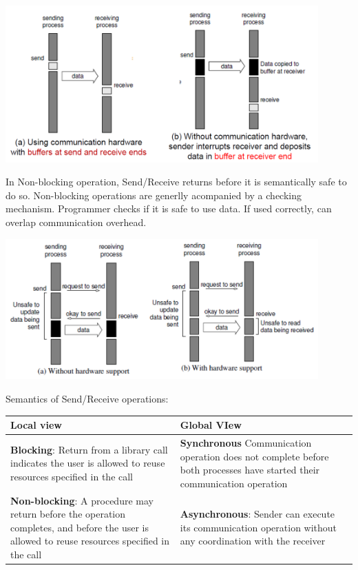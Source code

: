 \documentclass{article}
\begin{document}
\includegraphics[width=0.9\textwidth]{l8_buffered_blocking.png}

In Non-blocking operation, Send/Receive returns before it is semantically safe to do so.
Non-blocking operations are generlly acompanied by a checking mechanism.
Programmer checks if it is safe to use data.
If used correctly, can overlap communication overhead.

\includegraphics[width=0.9\textwidth]{l8_non_buffered_non_blocking.png}

Semantics of Send/Receive operations:

\begin{tabularx}{0.9\textwidth} {
        | >{\centering\arraybackslash}X
        | >{\centering\arraybackslash}X |}
    \hline
    Local view                                                                                                                                            & Global VIew \\
    \hline
    \textbf{Blocking}: Return from a library call indicates the user is allowed to reuse resources specified in the call                                  &
    \textbf{Synchronous} Communication operation does not complete before both processes have started their communication operation                                     \\
    \hline
    \textbf{Non-blocking}: A procedure may return before the operation completes, and before the user is allowed to reuse resources specified in the call &
    \textbf{Asynchronous}: Sender can execute its communication operation without any coordination with the receiver                                                    \\
    \hline
\end{tabularx}
\end{document}
